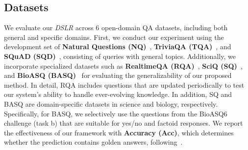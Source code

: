 \subsection{Datasets}

We evaluate our \textit{DSLR} across 6 open-domain QA datasets, including both general and specific domains.
First, we conduct our experiment using the development set of \textbf{Natural Questions (NQ)}~\cite{NQ}, \textbf{TriviaQA (TQA)}~\cite{TQA}, and \textbf{SQuAD (SQD)}~\cite{SQD}, consisting of queries with general topics.
Additionally, we incorporate specialized datasets such as \textbf{RealtimeQA (RQA)}~\cite{Realtime}, \textbf{SciQ (SQ)}~\cite{sciq}, and \textbf{BioASQ (BASQ)}~\cite{bioasq, bioasq2} for evaluating the generalizability of our proposed method.
In detail, RQA includes questions that are updated periodically to test our system's ability to handle ever-evolving knowledge. 
In addition, SQ and BASQ are domain-specific datasets in science and biology, respectively.
Specifically, for BASQ, we selectively use the questions from the BioASQ6 challenge (task b) that are suitable for yes/no and factoid responses.
We report the effectiveness of our framework with \textbf{Accuracy (Acc)}, which determines whether the prediction contains golden answers, following~\citet{selfrag}. 



